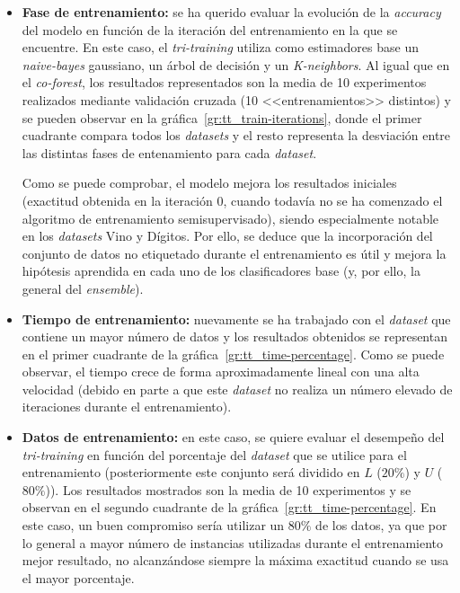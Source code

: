 \begin{itemize}
	\item \textbf{Fase de entrenamiento:} se ha querido evaluar la evolución de la \textit{accuracy} del modelo en función de la iteración del entrenamiento en la que se encuentre. En este caso, el \textit{tri-training} utiliza como estimadores base un \textit{naive-bayes} gaussiano, un árbol de decisión y un \textit{K-neighbors}. Al igual que en el \textit{co-forest}, los resultados representados son la media de 10 experimentos realizados mediante validación cruzada (10 <<entrenamientos>> distintos) y se pueden observar en la gráfica~\ref{gr:tt_train-iterations}, donde el primer cuadrante compara todos los \textit{datasets} y el resto representa la desviación entre las distintas fases de entenamiento para cada \textit{dataset}.
	
	Como se puede comprobar, el modelo mejora los resultados iniciales (exactitud obtenida en la iteración $0$, cuando todavía no se ha comenzado el algoritmo de entrenamiento semisupervisado), siendo especialmente notable en los \textit{datasets} Vino y Dígitos. Por ello, se deduce que la incorporación del conjunto de datos no etiquetado durante el entrenamiento es útil y mejora la hipótesis aprendida en cada uno de los clasificadores base (y, por ello, la general del \textit{ensemble}).
	
	\item \textbf{Tiempo de entrenamiento:} nuevamente se ha trabajado con el \textit{dataset} que contiene un mayor número de datos y los resultados obtenidos se representan en el primer cuadrante de la gráfica~\ref{gr:tt_time-percentage}. Como se puede observar, el tiempo crece de forma aproximadamente lineal con una alta velocidad (debido en parte a que este \textit{dataset} no realiza un número elevado de iteraciones durante el entrenamiento).
	
	\item \textbf{Datos de entrenamiento:} en este caso, se quiere evaluar el desempeño del \textit{tri-training} en función del porcentaje del \textit{dataset} que se utilice para el entrenamiento (posteriormente este conjunto será dividido en $L$ ($20\%$) y $U$ ($80\%$)). Los resultados mostrados son la media de 10 experimentos y se observan en el segundo cuadrante de la gráfica~\ref{gr:tt_time-percentage}. En este caso, un buen compromiso sería utilizar un $80\%$ de los datos, ya que por lo general a mayor número de instancias utilizadas durante el entrenamiento mejor resultado, no alcanzándose siempre la máxima exactitud cuando se usa el mayor porcentaje.
\end{itemize} 

